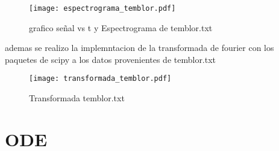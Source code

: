 \documentclass[12pt]{article}
\begin{document}
\begin{figure}[h!]
\centering
\texttt{[image: espectrograma\_temblor.pdf]}
\caption{grafico señal vs t y Espectrograma de temblor.txt }
\label{Fig.}
\end{figure}

ademas se realizo la implemntacion de la transformada de fourier con los paquetes de scipy a los datos provenientes de temblor.txt

\begin{figure}[h!]
\centering
\texttt{[image: transformada\_temblor.pdf]}
\caption{Transformada temblor.txt }
\label{Fig.}
\end{figure}



\section{ODE}
\end{document}
